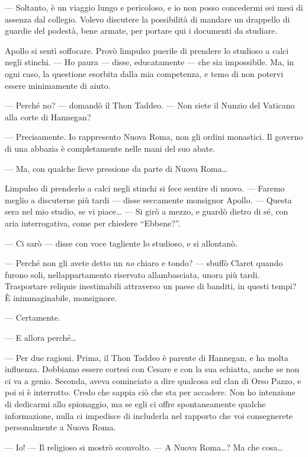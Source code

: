 	--- Soltanto, è un viaggio lungo e pericoloso, e io non posso concedermi
	sei mesi di assenza dal collegio. Volevo discutere la possibilità di
	mandare un drappello di guardie del podestà, bene armate, per portare
	qui i documenti da studiare.
	
	Apollo si sentì soffocare. Provò l\textquotesingle impulso puerile di
	prendere lo studioso a calci negli stinchi. --- Ho paura --- disse,
	educatamente --- che sia impossibile. Ma, in ogni caso, la questione
	esorbita dalla mia competenza, e temo di non potervi essere minimamente
	di aiuto.
	
	--- Perché no? --- domandò il Thon Taddeo. --- Non siete il Nunzio del
	Vaticano alla corte di Hannegan?
	
	--- Precisamente. Io rappresento Nuova Roma, non gli ordini monastici.
	Il governo di una abbazia è completamente nelle mani del suo abate.
	
	--- Ma, con qualche lieve pressione da parte di Nuova Roma\ldots{}
	
	L\textquotesingle impulso di prenderlo a calci negli stinchi si fece
	sentire di nuovo. --- Faremo meglio a discuterne più tardi --- disse
	seccamente monsignor Apollo. --- Questa sera nel mio studio, se vi
	piace\ldots{} --- Si girò a mezzo, e guardò dietro di sé, con aria
	interrogativa, come per chiedere ``Ebbene?''.
	
	--- Ci sarò --- disse con voce tagliente lo studioso, e si allontanò.
	
	--- Perché non gli avete detto un \emph{no} chiaro e tondo? --- sbuffò
	Claret quando furono soli, nell\textquotesingle appartamento riservato
	all\textquotesingle ambasciata, un\textquotesingle ora più tardi.
	Trasportare reliquie inestimabili attraverso un paese di banditi, in
	questi tempi? È inimmaginabile, monsignore.
	
	--- Certamente.
	
	--- E allora perché\ldots{}
	
	--- Per due ragioni. Prima, il Thon Taddeo è parente di Hannegan, e ha
	molta influenza. Dobbiamo essere cortesi con Cesare e con la sua
	schiatta, anche se non ci va a genio. Seconda, aveva cominciato a dire
	qualcosa sul clan di Orso Pazzo, e poi si è interrotto. Credo che sappia
	ciò che sta per accadere. Non ho intenzione di dedicarmi allo
	spionaggio, ma se egli ci offre spontaneamente qualche informazione,
	nulla ci impedisce di includerla nel rapporto che voi consegnerete
	personalmente a Nuova Roma.
	
	--- Io! --- Il religioso si mostrò sconvolto. --- A Nuova Roma\ldots? Ma
	che cosa\ldots{}
	
